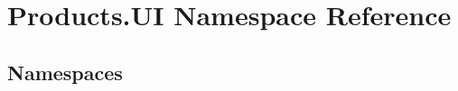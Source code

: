 \hypertarget{namespace_products_1_1_u_i}{}\section{Products.\+UI Namespace Reference}
\label{namespace_products_1_1_u_i}
\subsection*{Namespaces}
\begin{DoxyCompactItemize}
\end{DoxyCompactItemize}
